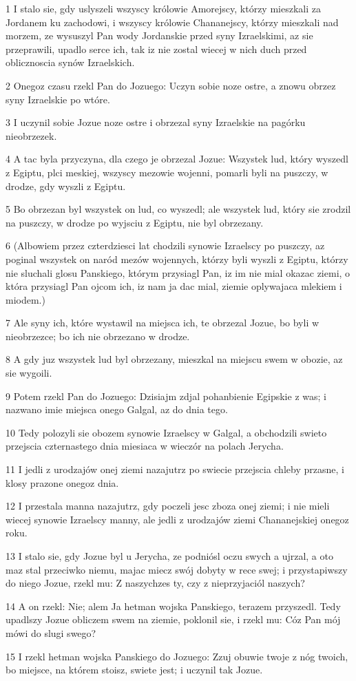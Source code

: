 \par 1 I stalo sie, gdy uslyszeli wszyscy królowie Amorejscy, którzy mieszkali za Jordanem ku zachodowi, i wszyscy królowie Chananejscy, którzy mieszkali nad morzem, ze wysuszyl Pan wody Jordanskie przed syny Izraelskimi, az sie przeprawili, upadlo serce ich, tak iz nie zostal wiecej w nich duch przed oblicznoscia synów Izraelskich.
\par 2 Onegoz czasu rzekl Pan do Jozuego: Uczyn sobie noze ostre, a znowu obrzez syny Izraelskie po wtóre.
\par 3 I uczynil sobie Jozue noze ostre i obrzezal syny Izraelskie na pagórku nieobrzezek.
\par 4 A tac byla przyczyna, dla czego je obrzezal Jozue: Wszystek lud, który wyszedl z Egiptu, plci meskiej, wszyscy mezowie wojenni, pomarli byli na puszczy, w drodze, gdy wyszli z Egiptu.
\par 5 Bo obrzezan byl wszystek on lud, co wyszedl; ale wszystek lud, który sie zrodzil na puszczy, w drodze po wyjsciu z Egiptu, nie byl obrzezany.
\par 6 (Albowiem przez czterdziesci lat chodzili synowie Izraelscy po puszczy, az poginal wszystek on naród mezów wojennych, którzy byli wyszli z Egiptu, którzy nie sluchali glosu Panskiego, którym przysiagl Pan, iz im nie mial okazac ziemi, o która przysiagl Pan ojcom ich, iz nam ja dac mial, ziemie oplywajaca mlekiem i miodem.)
\par 7 Ale syny ich, które wystawil na miejsca ich, te obrzezal Jozue, bo byli w nieobrzezce; bo ich nie obrzezano w drodze.
\par 8 A gdy juz wszystek lud byl obrzezany, mieszkal na miejscu swem w obozie, az sie wygoili.
\par 9 Potem rzekl Pan do Jozuego: Dzisiajm zdjal pohanbienie Egipskie z was; i nazwano imie miejsca onego Galgal, az do dnia tego.
\par 10 Tedy polozyli sie obozem synowie Izraelscy w Galgal, a obchodzili swieto przejscia czternastego dnia miesiaca w wieczór na polach Jerycha.
\par 11 I jedli z urodzajów onej ziemi nazajutrz po swiecie przejscia chleby przasne, i klosy prazone onegoz dnia.
\par 12 I przestala manna nazajutrz, gdy poczeli jesc zboza onej ziemi; i nie mieli wiecej synowie Izraelscy manny, ale jedli z urodzajów ziemi Chananejskiej onegoz roku.
\par 13 I stalo sie, gdy Jozue byl u Jerycha, ze podniósl oczu swych a ujrzal, a oto maz stal przeciwko niemu, majac miecz swój dobyty w rece swej; i przystapiwszy do niego Jozue, rzekl mu: Z naszychzes ty, czy z nieprzyjaciól naszych?
\par 14 A on rzekl: Nie; alem Ja hetman wojska Panskiego, terazem przyszedl. Tedy upadlszy Jozue obliczem swem na ziemie, poklonil sie, i rzekl mu: Cóz Pan mój mówi do slugi swego?
\par 15 I rzekl hetman wojska Panskiego do Jozuego: Zzuj obuwie twoje z nóg twoich, bo miejsce, na którem stoisz, swiete jest; i uczynil tak Jozue.

